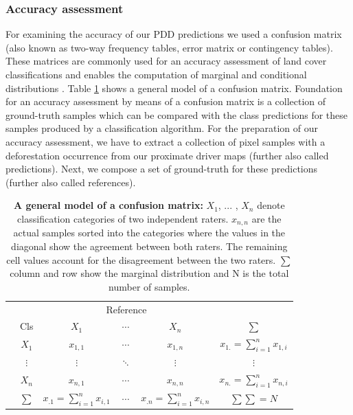 		\subsubsection{Accuracy assessment}
			For examining the accuracy of our \ac{PDD} predictions we used a confusion matrix (also known as two-way frequency tables, error matrix or contingency tables). These matrices are commonly used for an accuracy assessment of land cover classifications and enables the computation of marginal and conditional distributions \citep{Congalton1991,Foody2002}. Table \ref{tab:confusion} shows a general model of a confusion matrix. Foundation for an accuracy assessment by means of a confusion matrix is a collection of ground-truth samples which can be compared with the class predictions for these samples produced by a classification algorithm. For the preparation of our accuracy assessment, we have to extract a collection of pixel samples with a deforestation occurrence from our proximate  driver maps (further also called predictions). Next, we compose a set of ground-truth for these predictions (further also called references).
			\begin{table}[ht]
				\centering
				\caption[A general model of a confusion matrix]{\textbf{A general model of a confusion matrix:} $X_1$, ... , $X_n$ denote classification categories of two independent raters. $x_{n,n}$ are the actual samples sorted into the categories where the values in the diagonal show the agreement between both raters. The remaining cell values account for the disagreement between the two raters. $\sum$ column and row show the marginal distribution and N is the total number of samples.}
				\label{tab:confusion}
				\begin{tabular}{lccccc}
					\hline
					& & \multicolumn{3}{c}{Reference} & \\
					& Cls & $X_1$ & $\cdots$ & $X_n$ & $\sum$ \\\hline
					\multirow{4}{*}{\STAB{\rotatebox[origin=c]{90}{Predict}}}
					& $X_1$ & $x_{1,1}$ & $\cdots$ & $x_{1,n}$ & $x_{1.}=
					\displaystyle\sum_{i=1}^{n} x_{1,i}$ \\ 
					& $\vdots$ & $\vdots$ & $\ddots$ & $\vdots$ & $\vdots$ \\ 
					& $X_n$ & $x_{n,1}$ & $\cdots$ & $x_{n,n}$ & $x_{n.}=\displaystyle\sum_{i=1}^{n}x_{n,i}$ \\\hline 
					& $\sum$ & $x_{.1}=\displaystyle\sum_{i=1}^{n}x_{i,1}$ & $\cdots$ & $x_{.n}=\displaystyle\sum_{i=1}^{n}x_{i,n}$ & $\sum\sum=N$ \\\hline
				\end{tabular}
			\end{table}

